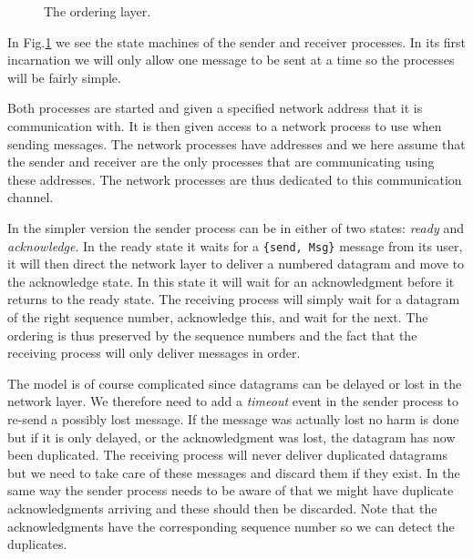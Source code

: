 \documentclass[a4paper,11pt]{article}
\begin{document}
\begin{figure}
\begin{adjustwidth}{-3cm}{-3cm}
\begin{subfigure}[b]{6cm}
{}
\end{subfigure}

\caption{The ordering layer.}
\label{fig:order}
\end{adjustwidth}
\end{figure}

In Fig.\ref{fig:order} we see the state machines of the sender and
receiver processes. In its first incarnation we will only allow one
message to be sent at a time so the processes will be fairly simple.

Both processes are started and given a specified network address that
it is communication with. It is then given access to a network process
to use when sending messages. The network processes have addresses and
we here assume that the sender and receiver are the only processes
that are communicating using these addresses. The network processes are
thus dedicated to this communication channel.


In the simpler version the sender process can be in either of two
states: {\em ready} and {\em acknowledge}. In the ready state it waits
for a {\tt \{send, Msg\}} message from its user, it will then direct
the network layer to deliver a numbered datagram and move to the
acknowledge state. In this state it will wait for an acknowledgment
before it returns to the ready state. The receiving process will
simply wait for a datagram of the right sequence number, acknowledge
this, and wait for the next. The ordering is thus preserved by the
sequence numbers and the fact that the receiving process will only
deliver messages in order.

The model is of course complicated since datagrams can be delayed or
lost in the network layer. We therefore need to add a {\em timeout}
event in the sender process to re-send a possibly lost message. If the
message was actually lost no harm is done but if it is only delayed,
or the acknowledgment was lost, the datagram has now been
duplicated. The receiving process will never deliver duplicated
datagrams but we need to take care of these messages and discard them
if they exist. In the same way the sender process needs to be aware of
that we might have duplicate acknowledgments arriving and these should
then be discarded. Note that the acknowledgments have the
corresponding sequence number so we can detect the duplicates.
\end{document}

